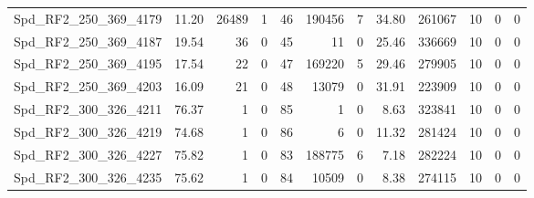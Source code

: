 \begin{longtable}[c]{@{}lrrrrrrrrrrr@{}}
Spd\_RF2\_250\_369\_4179      & 11.20                  & 26489                   & 1                       & 46                     & 190456                  & 7                       & 34.80                   & 261067                   & 10                       & 0                        & 0                        \\
Spd\_RF2\_250\_369\_4187      & 19.54                  & 36                      & 0                       & 45                     & 11                      & 0                       & 25.46                   & 336669                   & 10                       & 0                        & 0                        \\
Spd\_RF2\_250\_369\_4195      & 17.54                  & 22                      & 0                       & 47                     & 169220                  & 5                       & 29.46                   & 279905                   & 10                       & 0                        & 0                        \\
Spd\_RF2\_250\_369\_4203      & 16.09                  & 21                      & 0                       & 48                     & 13079                   & 0                       & 31.91                   & 223909                   & 10                       & 0                        & 0                        \\
Spd\_RF2\_300\_326\_4211      & 76.37                  & 1                       & 0                       & 85                     & 1                       & 0                       & 8.63                    & 323841                   & 10                       & 0                        & 0                        \\
Spd\_RF2\_300\_326\_4219      & 74.68                  & 1                       & 0                       & 86                     & 6                       & 0                       & 11.32                   & 281424                   & 10                       & 0                        & 0                        \\
Spd\_RF2\_300\_326\_4227      & 75.82                  & 1                       & 0                       & 83                     & 188775                  & 6                       & 7.18                    & 282224                   & 10                       & 0                        & 0                        \\
Spd\_RF2\_300\_326\_4235      & 75.62                  & 1                       & 0                       & 84                     & 10509                   & 0                       & 8.38                    & 274115                   & 10                       & 0                        & 0                        \\

\end{longtable}
